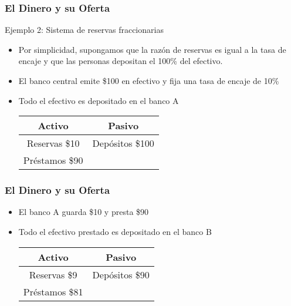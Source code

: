 \documentclass[dvipsnames,table,leqno]{beamer}
\begin{document}
		\begin{frame}
			\frametitle{El Dinero y su Oferta}
			Ejemplo 2: Sistema de reservas fraccionarias
			\begin{itemize}
				\item Por simplicidad, supongamos que la razón de reservas es igual a la tasa de encaje y que las personas depositan el 100\% del efectivo.
				\item El banco central emite \$100 en efectivo y fija una tasa de encaje de 10\%
				\item Todo el efectivo es depositado en el banco A
							\begin{table}[htbp!]
								\centering
									\begin{tabular}{|c|c|}\hline
										\textbf{Activo} & \textbf{Pasivo} \\ [1ex] \hline
										Reservas \$10& Depósitos \$100 \\ [1ex] \hline
										Préstamos \$90& \\ [1ex] \hline
									\end{tabular}%
							\end{table}
			\end{itemize}
		\end{frame}	

		\begin{frame}
			\frametitle{El Dinero y su Oferta}
			\begin{itemize}
				\item El banco A guarda \$10 y presta \$90
				\item Todo el efectivo prestado es depositado en el banco B
							\begin{table}[htbp!]
								\centering
									\begin{tabular}{|c|c|}\hline
										\textbf{Activo} & \textbf{Pasivo} \\ [1ex] \hline
										Reservas \$9& Depósitos \$90 \\ [1ex] \hline
										Préstamos \$81& \\ [1ex] \hline
									\end{tabular}%
							\end{table}
			\end{itemize}
		\end{frame}	
\end{document}
